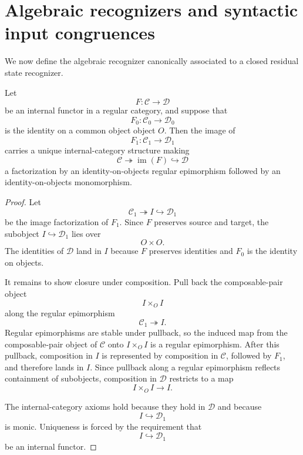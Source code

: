 \section{Algebraic recognizers and syntactic input congruences}
\label{sec:reiterman-algebraic-recognizers}

We now define the algebraic recognizer canonically associated to a closed
residual state recognizer.

\begin{lemma}
\label{lem:reiterman-image-identity-on-objects-functor}
Let
\[
F:\mathcal C\to\mathcal D
\]
be an internal functor in a regular category, and suppose that
\[
F_0:\mathcal C_0\to\mathcal D_0
\]
is the identity on a common object object \(O\). Then the image of
\[
F_1:\mathcal C_1\to\mathcal D_1
\]
carries a unique internal-category structure making
\[
\mathcal C
\twoheadrightarrow
\operatorname{im}(F)
\hookrightarrow
\mathcal D
\]
a factorization by an identity-on-objects regular epimorphism followed by an
identity-on-objects monomorphism.
\end{lemma}

\begin{proof}
Let
\[
\mathcal C_1\twoheadrightarrow I\hookrightarrow\mathcal D_1
\]
be the image factorization of \(F_1\). Since \(F\) preserves source and
target, the subobject \(I\hookrightarrow \mathcal D_1\) lies over
\[
O\times O.
\]
The identities of \(\mathcal D\) land in \(I\) because \(F\) preserves
identities and \(F_0\) is the identity on objects.

It remains to show closure under composition. Pull back the composable-pair
object
\[
I\times_O I
\]
along the regular epimorphism
\[
\mathcal C_1\twoheadrightarrow I.
\]
Regular epimorphisms are stable under pullback, so the induced map from the
composable-pair object of \(\mathcal C\) onto \(I\times_O I\) is a regular
epimorphism. After this pullback, composition in \(I\) is represented by
composition in \(\mathcal C\), followed by \(F_1\), and therefore lands in
\(I\). Since pullback along a regular epimorphism reflects containment of
subobjects, composition in \(\mathcal D\) restricts to a map
\[
I\times_O I\to I.
\]

The internal-category axioms hold because they hold in \(\mathcal D\) and
because
\[
I\hookrightarrow \mathcal D_1
\]
is monic. Uniqueness is forced by the requirement that
\[
I\hookrightarrow\mathcal D_1
\]
be an internal functor.
\end{proof}

